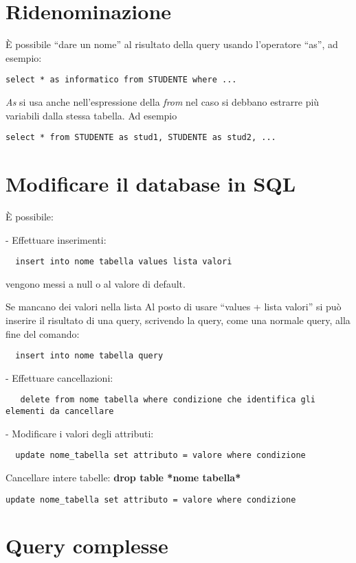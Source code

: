 \documentclass[\main/main.tex]{subfiles}
\begin{document}
\section{Ridenominazione}
È possibile ``dare un nome'' al risultato della query usando l'operatore ``as'', ad esempio:
\begin{verbatim}
select * as informatico from STUDENTE where ...
\end{verbatim}
\textit{As} si usa anche nell'espressione della \textit{from} nel caso si debbano estrarre più variabili dalla stessa tabella.
Ad esempio
\begin{verbatim}
select * from STUDENTE as stud1, STUDENTE as stud2, ...
\end{verbatim}


\section{Modificare il database in SQL}
È possibile:

- Effettuare inserimenti:
\begin{verbatim}
  insert into nome tabella values lista valori
\end{verbatim}
vengono messi a null o al valore di default.

Se mancano dei valori nella lista
Al posto di usare ``values + lista valori'' si può inserire il risultato di una query, scrivendo la query, come una normale query, alla fine del comando:
\begin{verbatim}
  insert into nome tabella query
      \end{verbatim}


- Effettuare cancellazioni:
\begin{verbatim}
   delete from nome tabella where condizione che identifica gli elementi da cancellare
\end{verbatim}

- Modificare i valori degli attributi:
\begin{verbatim}
  update nome_tabella set attributo = valore where condizione
\end{verbatim}

Cancellare intere tabelle: \textbf{drop table *nome tabella*}

\begin{verbatim}
update nome_tabella set attributo = valore where condizione
\end{verbatim}

\section{Query complesse}
\end{document}
